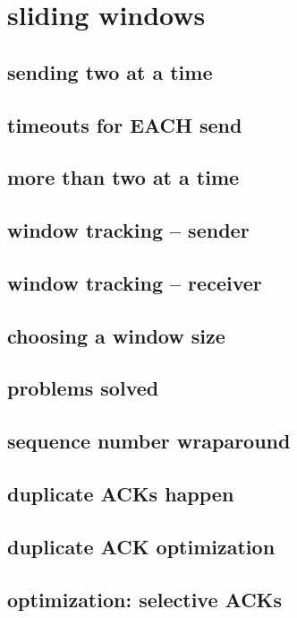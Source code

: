 \section{sliding windows}

\subsection{sending two at a time}


\subsection{timeouts for EACH send}


\subsection{more than two at a time}


\subsection{window tracking -- sender}


\subsection{window tracking -- receiver}


\subsection{choosing a window size}


\subsection{problems solved}


\subsection{sequence number wraparound}


\subsection{duplicate ACKs happen}


\subsection{duplicate ACK optimization}


\subsection{optimization: selective ACKs}

